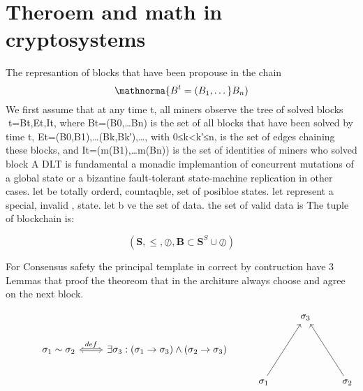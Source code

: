 \documentclass{article}
\begin{document}
\section{Theroem and math in cryptosystems}
The represantion of blocks that have been propouse in the chain
\begin{equation}
 \mathnorma{B^t= (B_1, \dotso }B_n)
 \end{equation}
We first assume that at any time t⁠, all miners observe the tree of solved blocks t={Bt,Et,It}⁠, where Bt=(B0,…Bn) is the set of all blocks that have been solved by time t⁠, Et={(B0,B1),…(Bk,Bk′),…}⁠, with 0≤k<k′≤n⁠, is the set of edges chaining these blocks, and It=(m(B1),…m(Bn)) is the set of identities of miners who solved block
A DLT is fundamental a monadic implemantion of concurrent mutations of a global state or a bizantine fault-tolerant state-machine replication in other cases.
let  be totally orderd, countaqble, set of posibloe states.
let represent a special, invalid , state.
let b ve the set of data. the set of valid data is  
The tuple of blockchain is:


\begin{equation}
( \mathbf{S} , \leq, \oslash, \mathbf{B} \subset \mathbf{S}^S∪\oslash)


\end{equation}

For Consensus safety the principal template in correct by contruction have 3 Lemmas that proof the theoreom that in the architure always choose and agree on the next block.
\begin{defn}

\begin{equation*}
\begin{tikzcd}
{}
  &
{}  
  &
{}  
  &
{}
  &
\sigma_3
  &
{}
  \\
{}
  &
\sigma_1 \sim \sigma_2
  \arrow[r,Leftrightarrow, "def"]
  &
\exists \sigma_3:(\sigma_1 \to \sigma_3) \land (\sigma_2 \to \sigma_3)
  &
{}  
  &
{}
  &
{}
  \\
{}  
  &
{}  
  &
{}
  &
\sigma_1
  \arrow[uur,""]
  &
{}
  &
\sigma_2
  \arrow[uul,""]
\end{tikzcd}
\end{equation*}
\end{defn}
\end{document}
